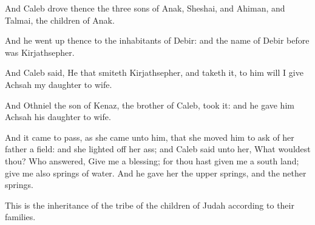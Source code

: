 \Verse And Caleb drove thence the three sons of Anak, Sheshai, and Ahiman, and Talmai, the children of Anak.

\Verse And he went up thence to the inhabitants of Debir: and the name of Debir before was Kirjathsepher.

\Verse And Caleb said, He that smiteth Kirjathsepher, and taketh it, to him will I give Achsah my daughter to wife.

\Verse And Othniel the son of Kenaz, the brother of Caleb, took it: and he gave him Achsah his daughter to wife.

\Verse And it came to pass, as she came unto him, that she moved him to ask of her father a field: and she lighted off her ass; and Caleb said unto her, What wouldest thou?  \Verse Who answered, Give me a blessing; for thou hast given me a south land; give me also springs of water.  And he gave her the upper springs, and the nether springs.

\Verse This is the inheritance of the tribe of the children of Judah according to their families.

